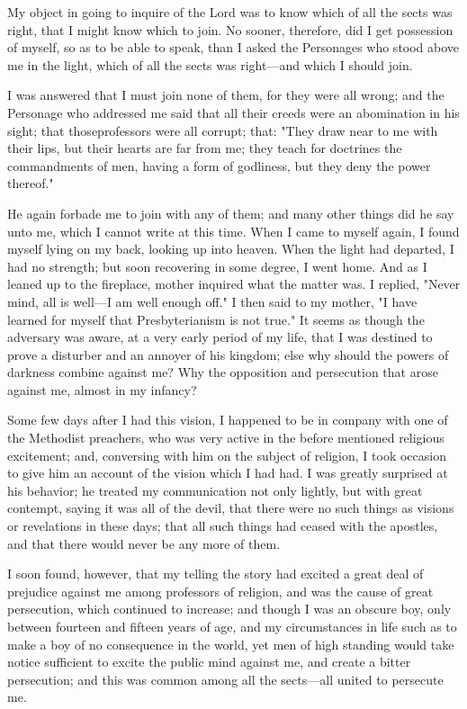 My object in going to inquire of the Lord was to know which of all the sects was right, that I
might know which to join. No sooner, therefore, did I get possession of myself, so as to be
able to speak, than I asked the Personages who stood above me in the light, which of all the
sects was right—and which I should join.

I was answered that I must join none of them, for they were all wrong; and the Personage
who addressed me said that all their creeds were an abomination in his sight; that thoseprofessors were all corrupt; that: "They draw near to me with their lips, but their hearts are
far from me; they teach for doctrines the commandments of men, having a form of godliness,
but they deny the power thereof."

He again forbade me to join with any of them; and many other things did he say unto me,
which I cannot write at this time. When I came to myself again, I found myself lying on my
back, looking up into heaven. When the light had departed, I had no strength; but soon
recovering in some degree, I went home. And as I leaned up to the fireplace, mother inquired
what the matter was. I replied, "Never mind, all is well—I am well enough off." I then said to
my mother, "I have learned for myself that Presbyterianism is not true." It seems as though
the adversary was aware, at a very early period of my life, that I was destined to prove a
disturber and an annoyer of his kingdom; else why should the powers of darkness combine
against me? Why the opposition and persecution that arose against me, almost in my
infancy?

Some few days after I had this vision, I happened to be in company with one of the
Methodist preachers, who was very active in the before mentioned religious excitement; and,
conversing with him on the subject of religion, I took occasion to give him an account of the
vision which I had had. I was greatly surprised at his behavior; he treated my communication
not only lightly, but with great contempt, saying it was all of the devil, that there were no
such things as visions or revelations in these days; that all such things had ceased with the
apostles, and that there would never be any more of them.

I soon found, however, that my telling the story had excited a great deal of prejudice against
me among professors of religion, and was the cause of great persecution, which continued to
increase; and though I was an obscure boy, only between fourteen and fifteen years of age,
and my circumstances in life such as to make a boy of no consequence in the world, yet men
of high standing would take notice sufficient to excite the public mind against me, and create
a bitter persecution; and this was common among all the sects—all united to persecute me.

